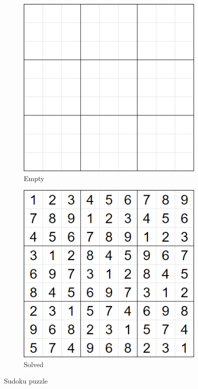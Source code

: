 \begin{figure}[H]
  \centering
  \begin{subfigure}{.49\linewidth}
    \centering
    \includegraphics[width=\linewidth]{content/assets/03_grovers_algorithm/sudoku_3_empty.png}
    \caption{Empty}
  \end{subfigure}
  \begin{subfigure}{.49\linewidth}
    \centering
    \includegraphics[width=\linewidth]{content/assets/03_grovers_algorithm/sudoku_3_solution.png}
    \caption{Solved}
  \end{subfigure}
  \caption{Sudoku puzzle}
\end{figure}


